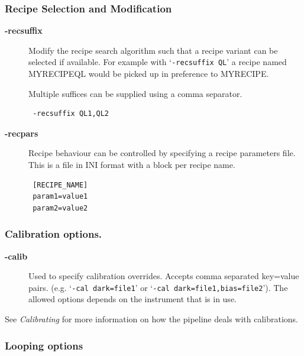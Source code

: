 \documentclass[twoside,11pt]{article}
\renewcommand{\_}{\texttt{\symbol{95}}}
\begin{document}
\subsubsection*{Recipe Selection and Modification\label{oracdr_Recipe_Selection_and_Modification}}
\begin{description}

\item[{\textbf{-recsuffix}}] \mbox{}

Modify the recipe search algorithm such that a recipe variant can be
selected if available. For example with `\texttt{-recsuffix QL}' a recipe
named MYRECIPE\_QL would be picked up in preference to MYRECIPE.



Multiple suffices can be supplied using a comma separator.

\begin{verbatim}
 -recsuffix QL1,QL2
\end{verbatim}

\item[{\textbf{-recpars}}] \mbox{}

Recipe behaviour can be controlled by specifying a recipe parameters
file. This is a file in INI format with a block per recipe name.

\begin{verbatim}
 [RECIPE_NAME]
 param1=value1
 param2=value2
\end{verbatim}
\end{description}
\subsubsection*{Calibration options.\label{oracdr_Calibration_options_}}
\begin{description}

\item[{\textbf{-calib}}] \mbox{}

Used to specify calibration overrides. Accepts comma separated key=value
pairs. (e.g. `\texttt{-cal dark=file1}' or `\texttt{-cal dark=file1,bias=file2}'). The
allowed options depends on the instrument that is in use.

\end{description}


See \emph{Calibrating} for more information on how the pipeline deals
with calibrations.

\subsubsection*{Looping options\label{oracdr_Looping_options}}
\end{document}
